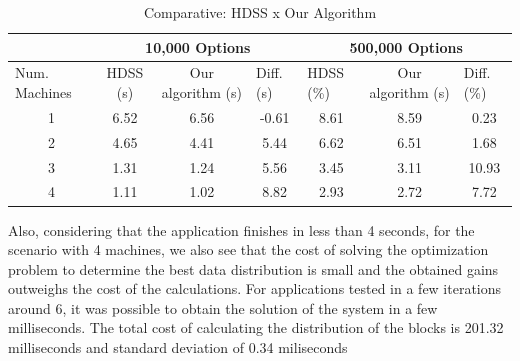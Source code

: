\documentclass[journal]{IEEEtran}
\begin{document}
\begin{table}[htb]
\centering
\caption{Comparative: HDSS x Our Algorithm}
\begin{tabular}{c|c|c|c|c|c|c|}
\cline{2-7}
\multicolumn{1}{l|}{}                 & \multicolumn{3}{c|}{10,000 Options}                              & \multicolumn{3}{c|}{500,000 Options}                                                  \\ \hline
\multicolumn{1}{|l|}{Num. Machines} & HDSS (s) & Our algorithm (s) & \multicolumn{1}{l|}{Diff. (s)} & \multicolumn{1}{l|}{HDSS (\%)} & Our algorithm (s) & \multicolumn{1}{l|}{Diff. (\%)} \\ \hline
\multicolumn{1}{|c|}{1 }       & 6.52     & 6.56              &    -0.61                       
			 & 8.61                          & 8.59              &   0.23                         \\ \hline
\multicolumn{1}{|c|}{2 }      & 4.65     & 4.41              &    5.44                         
				& 6.62                          & 6.51              & 1.68                            \\ \hline
\multicolumn{1}{|c|}{3 }      & 1.31     & 1.24              & 5.56                            
			& 3.45                          & 3.11              &         10.93                    \\ \hline
\multicolumn{1}{|c|}{4 }      & 1.11     & 1.02              & 8.82                       
			    & 2.93                          & 2.72              &         7.72                  \\ \hline
\end{tabular}
\label{table: black}
\end{table}

Also, considering that the application finishes in less than 4 seconds, for the
scenario with 4 machines, we also see that the cost of solving the optimization
problem to determine the best data distribution is small and the obtained gains
outweighs the cost of the calculations. For applications tested in a few
iterations around 6, it was possible to obtain the solution of the system in a
few milliseconds. The total cost of calculating the distribution of the blocks is 201.32 
milliseconds and standard deviation of 0.34 miliseconds
\end{document}
